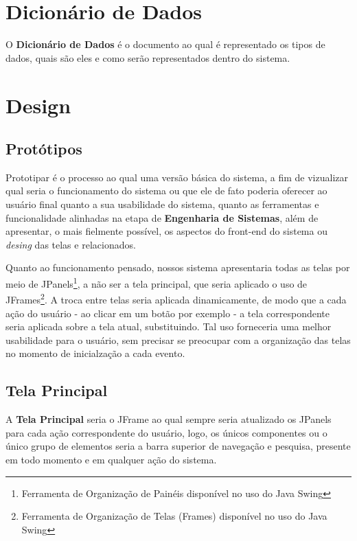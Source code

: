 \documentclass[a4paper,12pt]{article}
\begin{document}
\section{Dicionário de Dados}
O \textbf{Dicionário de Dados} é o documento ao qual é representado os tipos de dados, quais são eles e como serão representados dentro do sistema.

\section{Design}
\subsection{Protótipos}
Prototipar é o processo ao qual uma versão básica do sistema, a fim de vizualizar qual seria o funcionamento do sistema ou que ele de fato poderia oferecer ao usuário final quanto a sua usabilidade do sistema, quanto as ferramentas e funcionalidade alinhadas na etapa de \textbf{Engenharia de Sistemas}, além de apresentar, o mais fielmente possível, os aspectos do front-end do sistema ou \textit{desing} das telas e relacionados.

Quanto ao funcionamento pensado, nossos sistema apresentaria todas as telas por meio de JPanels\footnote{
	Ferramenta de Organização de Painéis disponível no uso do Java Swing
}, a não ser a tela principal, que seria aplicado o uso de JFrames\footnote{
	Ferramenta de Organização de Telas (Frames) disponível no uso do Java Swing
}. A troca entre telas seria aplicada dinamicamente, de modo que a cada ação do usuário - ao clicar em um botão por exemplo - a tela correspondente seria aplicada sobre a tela atual, substituindo. Tal uso forneceria uma melhor usabilidade para o usuário, sem precisar se preocupar com a organização das telas no momento de inicialzação a cada evento.

\subsection{Tela Principal}
A \textbf{Tela Principal} seria o JFrame ao qual sempre seria atualizado os JPanels para cada ação correspondente do usuário, logo, os únicos componentes ou o único grupo de elementos seria a barra superior de navegação e pesquisa, presente em todo momento e em qualquer ação do sistema.
\end{document}
